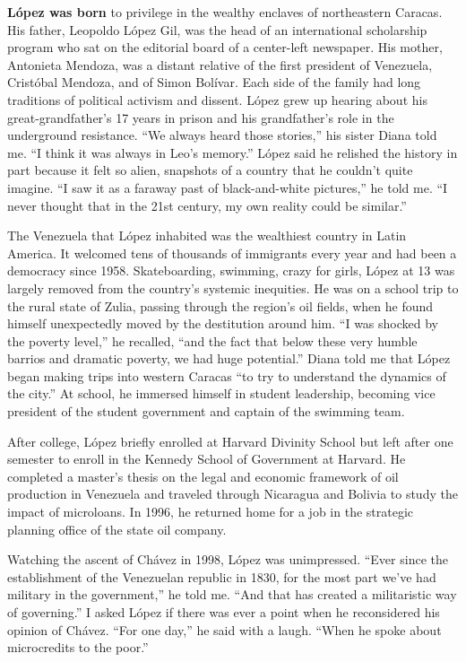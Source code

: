 \textbf{López was born} to privilege in the wealthy enclaves of
northeastern Caracas. His father, Leopoldo López Gil, was the head of an
international scholarship program who sat on the editorial board of a
center-left newspaper. His mother, Antonieta Mendoza, was a distant
relative of the first president of Venezuela, Cristóbal Mendoza, and of
Simon Bolívar. Each side of the family had long traditions of political
activism and dissent. López grew up hearing about his
great-grandfather's 17 years in prison and his grandfather's role in the
underground resistance. ``We always heard those stories,'' his sister
Diana told me. ``I think it was always in Leo's memory.'' López said he
relished the history in part because it felt so alien, snapshots of a
country that he couldn't quite imagine. ``I saw it as a faraway past of
black-and-white pictures,'' he told me. ``I never thought that in the
21st century, my own reality could be similar.''

The Venezuela that López inhabited was the wealthiest country in Latin
America. It welcomed tens of thousands of immigrants every year and had
been a democracy since 1958. Skateboarding, swimming, crazy for girls,
López at 13 was largely removed from the country's systemic inequities.
He was on a school trip to the rural state of Zulia, passing through the
region's oil fields, when he found himself unexpectedly moved by the
destitution around him. ``I was shocked by the poverty level,'' he
recalled, ``and the fact that below these very humble barrios and
dramatic poverty, we had huge potential.'' Diana told me that López
began making trips into western Caracas ``to try to understand the
dynamics of the city.'' At school, he immersed himself in student
leadership, becoming vice president of the student government and
captain of the swimming team.

After college, López briefly enrolled at Harvard Divinity School but
left after one semester to enroll in the Kennedy School of Government at
Harvard. He completed a master's thesis on the legal and economic
framework of oil production in Venezuela and traveled through Nicaragua
and Bolivia to study the impact of microloans. In 1996, he returned home
for a job in the strategic planning office of the state oil company.

Watching the ascent of Chávez in 1998, López was unimpressed. ``Ever
since the establishment of the Venezuelan republic in 1830, for the most
part we've had military in the government,'' he told me. ``And that has
created a militaristic way of governing.'' I asked López if there was
ever a point when he reconsidered his opinion of Chávez. ``For one
day,'' he said with a laugh. ``When he spoke about microcredits to the
poor.''

